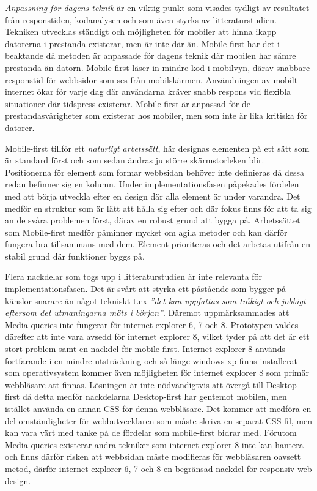 \documentclass[11pt]{article}
\begin{document}
\textit{Anpassning för dagens teknik} är en viktig punkt som visades tydligt av resultatet från responstiden, kodanalysen och som även styrks av litteraturstudien. Tekniken utvecklas ständigt och möjligheten för mobiler att hinna ikapp datorerna i prestanda existerar, men är inte där än. Mobile-first har det i beaktande då metoden är anpassade för dagens teknik där mobilen har sämre prestanda än datorn. Mobile-first läser in mindre kod i mobilvyn, därav snabbare responstid för webbsidor som ses från mobilskärmen. Användningen av mobilt internet ökar för varje dag där användarna kräver snabb respons vid flexibla situationer där tidspress existerar. Mobile-first är anpassad för de prestandasvårigheter som existerar hos mobiler, men som inte är lika kritiska för datorer. 

Mobile-first tillför ett \textit{naturligt arbetssätt}, här designas elementen på ett sätt som är standard först och som sedan ändras ju större skärmstorleken blir. Positionerna för element som formar webbsidan behöver inte definieras då dessa redan befinner sig en kolumn. Under implementationsfasen påpekades fördelen med att börja utveckla efter en design där alla element är under varandra. Det medför en struktur som är lätt att hålla sig efter och där fokus finns för att ta sig an de svåra problemen först, därav en robust grund att bygga på. Arbetssättet som Mobile-first medför påminner mycket om agila metoder och kan därför fungera bra tillsammans med dem. Element prioriteras och det arbetas utifrån en stabil grund där funktioner byggs på.

Flera nackdelar som togs upp i litteraturstudien är inte relevanta för implementationsfasen. Det är svårt att styrka ett påstående som bygger på känslor snarare än något tekniskt t.ex \textit{”det kan uppfattas som tråkigt och jobbigt eftersom det utmaningarna möts i början”}. Däremot uppmärksammades att Media queries inte fungerar för internet explorer 6, 7 och 8. Prototypen valdes därefter att inte vara avsedd för internet explorer 8, vilket tyder på att det är ett stort problem samt en nackdel för mobile-first. Internet explorer 8 används fortfarande i en mindre utsträckning och så länge windows xp finns installerat som operativsystem kommer även möjligheten för internet explorer 8 som primär webbläsare att finnas. Lösningen är inte nödvändigtvis att övergå till Desktop-first då detta medför nackdelarna Desktop-first har gentemot mobilen, men istället använda en annan CSS för denna webbläsare. Det kommer att medföra en del omständigheter för webbutvecklaren som måste skriva en separat CSS-fil, men kan vara värt med tanke på de fördelar som mobile-first bidrar med. Förutom Media queries existerar andra tekniker som internet explorer 8 inte kan hantera och finns därför risken att webbsidan måste modifieras för webbläsaren oavsett metod, därför internet explorer 6, 7 och 8 en begränsad nackdel för responsiv web design.
\end{document}
